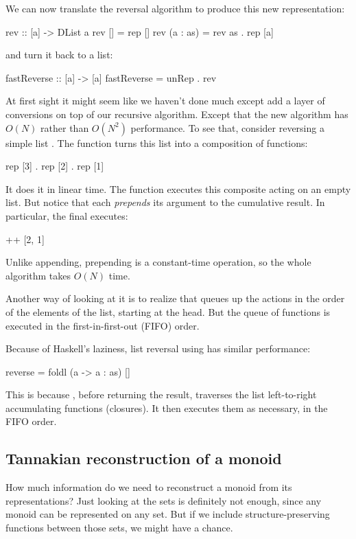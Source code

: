 \documentclass[DaoFP]{subfiles}
\begin{document}
We can now translate the reversal algorithm to produce this new representation:
\begin{haskell}
rev :: [a] -> DList a
rev [] = rep []
rev (a : as) = rev as . rep [a]
\end{haskell}
and turn it back to a list:
\begin{haskell}
fastReverse :: [a] -> [a]
fastReverse = unRep . rev
\end{haskell}
At first sight it might seem like we haven't done much except add a layer of conversions on top of our recursive algorithm. Except that the new algorithm has $O(N)$ rather than $O(N^2)$ performance. To see that, consider reversing a simple list \hask{[1, 2, 3]}. The function  turns this list into a composition of functions:
\begin{haskell}
 rep [3] . rep [2] . rep [1]
\end{haskell}
It does it in linear time. The function  executes this composite acting on an empty list. But notice that each  \emph{prepends} its argument to the cumulative result. In particular, the final  executes:
\begin{haskell}
 [3] ++ [2, 1]
\end{haskell}
Unlike appending, prepending is a constant-time operation, so the whole algorithm takes $O(N)$ time. 

Another way of looking at it is to realize that  queues up the actions in the order of the elements of the list, starting at the head. But the queue of functions is executed in the first-in-first-out (FIFO) order. 

Because of Haskell's laziness, list reversal using  has similar performance:
\begin{haskell}
reverse = foldl (\as a -> a : as) []
\end{haskell}
This is because , before returning the result, traverses the list left-to-right accumulating functions (closures). It then executes them as necessary, in the FIFO order.

\subsection{Tannakian reconstruction of a monoid}

How much information do we need to reconstruct a monoid from its representations? Just looking at the sets is definitely not enough, since any monoid can be represented on any set. But if we include structure-preserving functions between those sets, we might have a chance. 
\end{document}
